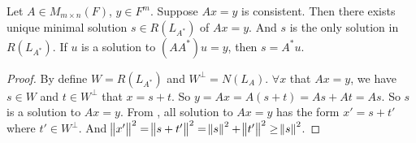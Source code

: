 \begin{theorem}
    Let $A \in M_{m\times n} (F)$, $y \in F^m$. Suppose $Ax=y$ is consistent. Then there exists unique minimal solution $s \in R(L_{A^*})$ of $Ax=y$. And $s$ is the only solution in $R(L_{A^*})$. If $u$ is a solution to $(AA^*) u = y$, then $s = A^* u$.
\end{theorem}
\begin{proof}
    By  define $W = R(L_{A^*})$ and $W^\bot = N(L_A)$. $\forall x$ that $Ax = y$, we have $s \in W$ and $t \in W^\bot$ that $x=s+t$. So $y = Ax = A(s + t) = As + At = As$. So $s$ is a solution to $Ax=y$. From , all solution to $Ax=y$ has the form $x' = s + t'$ where $t' \in W^\bot$. And $\norm{x'}^2 = \norm{s + t'}^2 = \norm{s}^2 + \norm{t'}^2 \geq \norm{s}^2$.
\end{proof}
















































































